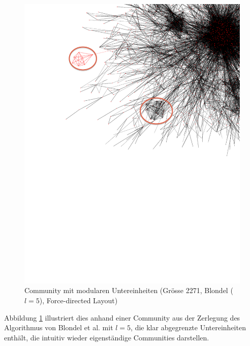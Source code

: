 \begin{figure}[ht]
  \centering
  \includegraphics[scale=0.7]{images/blondel-l5-com-c3a5eaab680984b123037897b0be74bf-edit.pdf}
  \caption{Community mit modularen Untereinheiten (Gr\"osse 2271,
    Blondel ($l=5$), Force-directed Layout)}
  \label{fig:large-modular}
\end{figure}

Abbildung \ref{fig:large-modular} illustriert dies anhand einer
Community aus der Zerlegung des Algorithmus von Blondel et al. mit
$l=5$, die klar abgegrenzte Untereinheiten enth\"alt, die intuitiv
wieder eigenst\"andige Communities darstellen.

